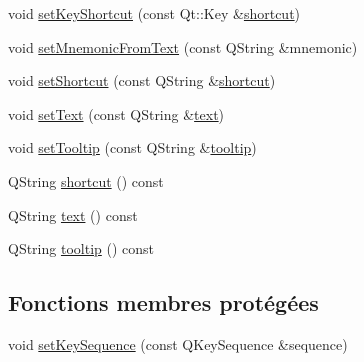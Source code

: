 \begin{DoxyCompactItemize}
void \hyperlink{classSH__ExtendedQQmlAction_aef8b6648357a2ea81a477e134ca885fa}{set\-Key\-Shortcut} (const Qt\-::\-Key \&\hyperlink{classSH__ExtendedQQmlAction_a9a0a096f07b5e5a5b3387699daf0358d}{shortcut})
\item 
void \hyperlink{classSH__ExtendedQQmlAction_a717e828cb0341e3d77eabe05e6143032}{set\-Mnemonic\-From\-Text} (const Q\-String \&mnemonic)
\item 
void \hyperlink{classSH__ExtendedQQmlAction_a3e731c850a34194354e6e043dc249a39}{set\-Shortcut} (const Q\-String \&\hyperlink{classSH__ExtendedQQmlAction_a9a0a096f07b5e5a5b3387699daf0358d}{shortcut})
\item 
void \hyperlink{classSH__ExtendedQQmlAction_a2071b7b2ea7583a21553b28b4be814ef}{set\-Text} (const Q\-String \&\hyperlink{classSH__ExtendedQQmlAction_a7c10b09152a7e72f82e3a8c6251b6284}{text})
\item 
void \hyperlink{classSH__ExtendedQQmlAction_a8c90255e9b7a957e82de4cae2226d3f8}{set\-Tooltip} (const Q\-String \&\hyperlink{classSH__ExtendedQQmlAction_a09728d442bc94953fc35e0eb9ece89c1}{tooltip})
\item 
Q\-String \hyperlink{classSH__ExtendedQQmlAction_a070cac95bfc43b184ca1f0a75592877b}{shortcut} () const 
\item 
Q\-String \hyperlink{classSH__ExtendedQQmlAction_a827915b0ce23a1af60d9aaaf7d052447}{text} () const 
\item 
Q\-String \hyperlink{classSH__ExtendedQQmlAction_ac703f5c565bd0c7a0892627885042f0c}{tooltip} () const 
\end{DoxyCompactItemize}
\subsection*{Fonctions membres protégées}
\begin{DoxyCompactItemize}
\item 
void \hyperlink{classSH__ExtendedQQmlAction_a7d624821268cc19aa44bcda3cd85b967}{set\-Key\-Sequence} (const Q\-Key\-Sequence \&sequence)
\end{DoxyCompactItemize}
